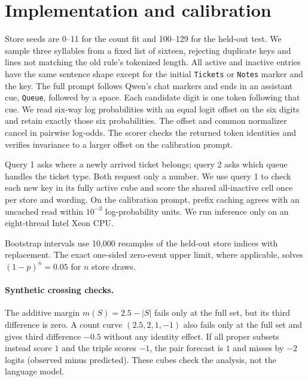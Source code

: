 \section{Implementation and calibration}
\label{app:details}

Store seeds are 0--11 for the count fit and 100--129 for the held-out test.
We sample three syllables from a fixed list of sixteen, rejecting duplicate keys and lines not matching the old rule's tokenized length.
All active and inactive entries have the same sentence shape except for the initial \texttt{Tickets} or \texttt{Notes} marker and the key.
The full prompt follows Qwen's chat markers and ends in an assistant cue, \texttt{Queue}, followed by a space.
Each candidate digit is one token following that cue.
We read six-way log probabilities with an equal logit offset on the six digits and retain exactly those six probabilities.
The offset and common normalizer cancel in pairwise log-odds.
The scorer checks the returned token identities and verifies invariance to a larger offset on the calibration prompt.

Query 1 asks where a newly arrived ticket belongs; query 2 asks which queue handles the ticket type. Both request only a number.
We use query 1 to check each new key in its fully active cube and score the shared all-inactive cell once per store and wording.
On the calibration prompt, prefix caching agrees with an uncached read within $10^{-3}$ log-probability units.
We run inference only on an eight-thread Intel Xeon CPU.

Bootstrap intervals use 10,000 resamples of the held-out store indices with replacement.
The exact one-sided zero-event upper limit, where applicable, solves $(1-p)^n=0.05$ for $n$ store draws.

\paragraph{Synthetic crossing checks.}
The additive margin $m(S)=2.5-|S|$ fails only at the full set, but its third difference is zero.
A count curve $(2.5,2,1,-1)$ also fails only at the full set and gives third difference $-0.5$ without any identity effect.
If all proper subsets instead score $1$ and the triple scores $-1$, the pair forecast is $1$ and misses by $-2$ logits (observed minus predicted).
These cubes check the analysis, not the language model.
